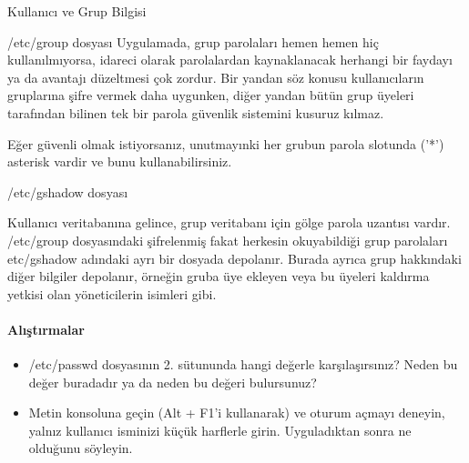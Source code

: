 \begin{section}{Kullanıcı ve Grup Bilgisi}
\begin{subsection}{/etc/group dosyası}
Uygulamada, grup parolaları hemen hemen hiç kullanılmıyorsa, idareci olarak parolalardan kaynaklanacak herhangi bir faydayı ya da avantajı düzeltmesi çok zordur. Bir yandan söz konusu kullanıcıların gruplarına şifre vermek daha uygunken, diğer yandan bütün grup üyeleri tarafından bilinen tek bir parola güvenlik sistemini kusuruz kılmaz.

Eğer güvenli olmak istiyorsanız, unutmayınki her grubun parola slotunda ('*') asterisk vardir ve bunu kullanabilirsiniz.
\end{subsection}
\begin{subsection}{/etc/gshadow dosyası}

Kullanıcı veritabanına gelince, grup veritabanı için gölge parola uzantısı vardır. /etc/group dosyasındaki şifrelenmiş fakat herkesin okuyabildiği grup parolaları etc/gshadow adındaki ayrı bir dosyada depolanır. Burada ayrıca grup hakkındaki diğer bilgiler depolanır, örneğin gruba üye ekleyen veya bu üyeleri kaldırma yetkisi olan yöneticilerin isimleri gibi.
\end{subsection}
\paragraph{Alıştırmalar}{
\begin{itemize}
\item /etc/passwd dosyasının 2. sütununda hangi değerle karşılaşırsınız? Neden bu değer buradadır ya da neden bu değeri bulursunuz?
\item Metin konsoluna geçin (Alt + F1'i kullanarak) ve oturum açmayı deneyin, yalnız kullanıcı isminizi küçük harflerle girin. Uyguladıktan sonra ne olduğunu söyleyin.
\end{itemize}
}
\end{section}
